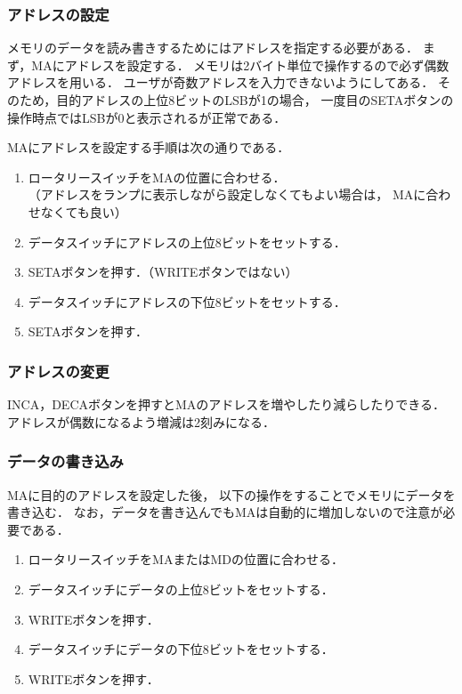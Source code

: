\subsubsection{アドレスの設定}
メモリのデータを読み書きするためにはアドレスを指定する必要がある．
まず，MAにアドレスを設定する．
メモリは2バイト単位で操作するので必ず偶数アドレスを用いる．
ユーザが奇数アドレスを入力できないようにしてある．
そのため，目的アドレスの上位8ビットのLSBが1の場合，
一度目のSETAボタンの操作時点ではLSBが0と表示されるが正常である．

MAにアドレスを設定する手順は次の通りである．

\begin{enumerate}
\item ロータリースイッチをMAの位置に合わせる．\\
（アドレスをランプに表示しながら設定しなくてもよい場合は，
MAに合わせなくても良い）
\item データスイッチにアドレスの上位8ビットをセットする．
\item SETAボタンを押す．（WRITEボタンではない）
\item データスイッチにアドレスの下位8ビットをセットする．
\item SETAボタンを押す．
\end{enumerate}

\subsubsection{アドレスの変更}
INCA，DECAボタンを押すとMAのアドレスを増やしたり減らしたりできる．
アドレスが偶数になるよう増減は2刻みになる．

\subsubsection{データの書き込み}
MAに目的のアドレスを設定した後，
以下の操作をすることでメモリにデータを書き込む．
なお，データを書き込んでもMAは自動的に増加しないので注意が必要である．

\begin{enumerate}
\item ロータリースイッチをMAまたはMDの位置に合わせる．
\item データスイッチにデータの上位8ビットをセットする．
\item WRITEボタンを押す．
\item データスイッチにデータの下位8ビットをセットする．
\item WRITEボタンを押す．
\end{enumerate}

